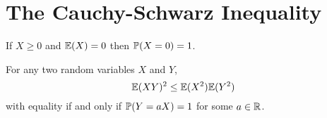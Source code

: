 
\section{The Cauchy-Schwarz Inequality}
\begin{lemma}\label{lem:pos_rv_expe_zero}
If $X\geq 0$ and $\mathbb{E}(X)=0$ then $\mathbb{P}(X=0)=1$.
\end{lemma}

\proofomitted

\begin{theorem}
For any two random variables $X$ and $Y$,
\[
\mathbb{E}(XY)^2 \leq \mathbb{E}(X^2)\mathbb{E}(Y^2)
\]
with equality if and only if $\mathbb{P}(Y=aX)=1$ for some $a\in\mathbb{R}$.
\end{theorem}

